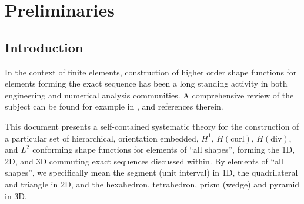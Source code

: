 \section{Preliminaries}
\label{sec:Introduction}

\subsection{Introduction}

In the context of finite elements, construction of higher order shape functions for elements forming the exact sequence has been a long standing activity in both engineering and numerical analysis communities.
A comprehensive review of the subject can be found for example in \citet{hpbook}, \citet{hpbook2} and references therein.

This document presents a self-contained systematic theory for the construction of a particular set of hierarchical, orientation embedded, $H^1$, $H(\mathrm{curl})$, $H(\mathrm{div})$, and $L^2$ conforming shape functions for elements of ``all shapes'', forming the 1D, 2D, and 3D commuting exact sequences discussed within.
By elements of ``all shapes'', we specifically mean the segment (unit interval) in 1D, the quadrilateral and triangle in 2D, and the hexahedron, tetrahedron, prism (wedge) and pyramid in 3D.

